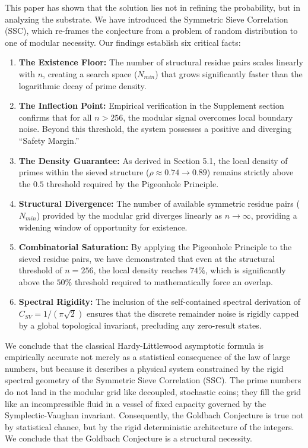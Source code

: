 \documentclass[twoside,9pt]{extarticle}
\begin{document}
This paper has shown that the solution lies not in refining the probability, but in analyzing the substrate. We have introduced the Symmetric Sieve Correlation (SSC), which re-frames the conjecture from a problem of random distribution to one of modular necessity. Our findings establish six critical facts:
\begin{enumerate}
    \item \textbf{The Existence Floor:} The number of structural residue pairs scales linearly with $n$, creating a search space ($N_{min}$) that grows significantly faster than the logarithmic decay of prime density.
    
    \item \textbf{The Inflection Point:} Empirical verification in the Supplement section confirms that for all $n > 256$, the modular signal overcomes local boundary noise. Beyond this threshold, the system possesses a positive and diverging ``Safety Margin.''
    
    \item \textbf{The Density Guarantee:} As derived in Section 5.1, the local density of primes within the sieved structure ($\rho \approx 0.74 \to 0.89$) remains strictly above the $0.5$ threshold required by the Pigeonhole Principle.
    
    \item \textbf{Structural Divergence:} The number of available symmetric residue pairs ($N_{min}$) provided by the modular grid diverges linearly as $n \to \infty$, providing a widening window of opportunity for existence.
    
    \item \textbf{Combinatorial Saturation:} By applying the Pigeonhole Principle to the sieved residue pairs, we have demonstrated that even at the structural threshold of $n=256$, the local density reaches $74\%$, which is significantly above the $50\%$ threshold required to mathematically force an overlap.
    
    \item \textbf{Spectral Rigidity:} The inclusion of the self-contained spectral derivation of $C_{SV} = 1/(\pi\sqrt{2})$ ensures that the discrete remainder noise is rigidly capped by a global topological invariant, precluding any zero-result states.
\end{enumerate}

We conclude that the classical Hardy-Littlewood asymptotic formula is empirically accurate not merely as a statistical consequence of the law of large numbers, but because it describes a physical system constrained by the rigid spectral geometry of the Symmetric Sieve Correlation (SSC). The prime numbers do not land in the modular grid like decoupled, stochastic coins; they fill the grid like an incompressible fluid in a vessel of fixed capacity governed by the Symplectic-Vaughan invariant. Consequently, the Goldbach Conjecture is true not by statistical chance, but by the rigid deterministic architecture of the integers. We conclude that the Goldbach Conjecture is a structural necessity.
\end{document}
